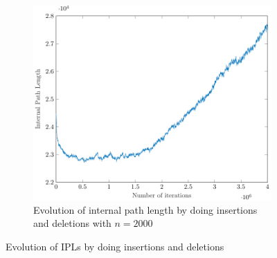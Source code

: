 \begin{figure}[ht]
\begin{subfigure}{0.32\textwidth}
    \end{subfigure}%
    \hfill
    \begin{subfigure}{0.32\textwidth}
        \centering
        \includegraphics[width=\textwidth]{IPLDelete2000.pdf}
        \caption{Evolution of internal path length by doing insertions and deletions with $n = 2000$}
    \end{subfigure}%
    \caption{Evolution of IPLs by doing insertions and deletions}
    \label{fig:evIPL}
\end{figure}

